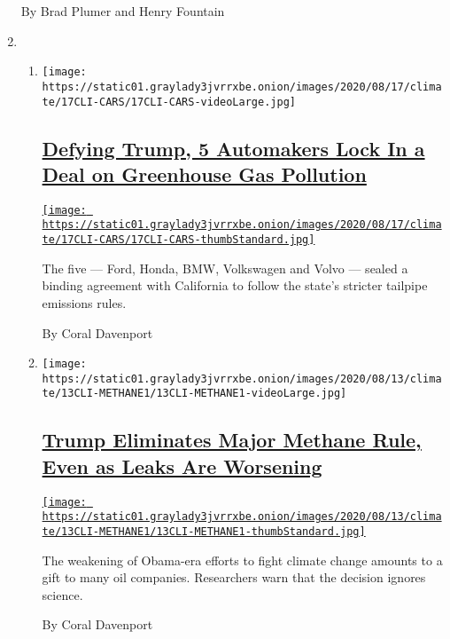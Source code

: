 \begin{enumerate}
  By Brad Plumer and Henry Fountain
\item
  \begin{enumerate}
  \def\labelenumii{\arabic{enumii}.}
  \item
    \texttt{[image: https://static01.graylady3jvrrxbe.onion/images/2020/08/17/climate/17CLI-CARS/17CLI-CARS-videoLarge.jpg]}

    \hypertarget{defying-trump-5-automakers-lock-in-a-deal-on-greenhouse-gas-pollution}{%
    \subsection{\texorpdfstring{\href{/2020/08/17/climate/california-automakers-pollution.html}{Defying
    Trump, 5 Automakers Lock In a Deal on Greenhouse Gas
    Pollution}}{Defying Trump, 5 Automakers Lock In a Deal on Greenhouse Gas Pollution}}\label{defying-trump-5-automakers-lock-in-a-deal-on-greenhouse-gas-pollution}}

    \href{/2020/08/17/climate/california-automakers-pollution.html}{\texttt{[image: https://static01.graylady3jvrrxbe.onion/images/2020/08/17/climate/17CLI-CARS/17CLI-CARS-thumbStandard.jpg]}}

    The five --- Ford, Honda, BMW, Volkswagen and Volvo --- sealed a
    binding agreement with California to follow the state's stricter
    tailpipe emissions rules.

    By Coral Davenport
  \item
    \texttt{[image: https://static01.graylady3jvrrxbe.onion/images/2020/08/13/climate/13CLI-METHANE1/13CLI-METHANE1-videoLarge.jpg]}

    \hypertarget{trump-eliminates-major-methane-rule-even-as-leaks-are-worsening}{%
    \subsection{\texorpdfstring{\href{/2020/08/13/climate/trump-methane.html}{Trump
    Eliminates Major Methane Rule, Even as Leaks Are
    Worsening}}{Trump Eliminates Major Methane Rule, Even as Leaks Are Worsening}}\label{trump-eliminates-major-methane-rule-even-as-leaks-are-worsening}}

    \href{/2020/08/13/climate/trump-methane.html}{\texttt{[image: https://static01.graylady3jvrrxbe.onion/images/2020/08/13/climate/13CLI-METHANE1/13CLI-METHANE1-thumbStandard.jpg]}}

    The weakening of Obama-era efforts to fight climate change amounts
    to a gift to many oil companies. Researchers warn that the decision
    ignores science.

    By Coral Davenport
  \end{enumerate}
\end{enumerate}

